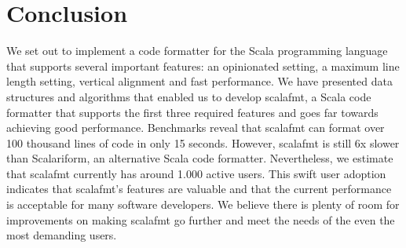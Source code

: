 
\section{Conclusion}
We set out to implement a code formatter for the Scala programming language that supports several important features: an opinionated setting, a maximum line length setting, vertical alignment and fast performance.
We have presented data structures and algorithms that enabled us to develop scalafmt, a Scala code formatter that supports the first three required features and goes far towards achieving good performance.
Benchmarks reveal that scalafmt can format over 100 thousand lines of code in only 15 seconds.
However, scalafmt is still 6x slower than Scalariform, an alternative Scala code formatter.
Nevertheless, we estimate that scalafmt currently has around 1.000 active users.
This swift user adoption indicates that scalafmt's features are valuable and that the current performance is acceptable for many software developers.
We believe there is plenty of room for improvements on making scalafmt go further and meet the needs of the even the most demanding users.
